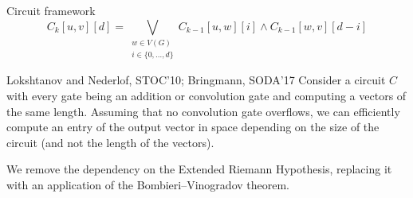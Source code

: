 \begin{frame}{Circuit framework}
    $$C_k[u,v][d]=\bigvee_{\substack{w\in V(G) \\  i\in \{0,\ldots,d\}}} C_{k-1}[u,w][i] \wedge C_{k-1}[w,v][d-i]$$
    
     
     
    \begin{block}{Lokshtanov and Nederlof, STOC'10; Bringmann, SODA'17}
    Consider a circuit $C$ with every gate being an addition or convolution gate and computing a vectors of the same length.
    Assuming that no convolution gate overflows,
    we can efficiently compute an entry of the output vector in space depending on the size of the circuit
    (and not the length of the vectors).
    \end{block}
    
    
    \begin{alertblock}{}
    We remove the dependency on the Extended Riemann Hypothesis, replacing it with an application of the Bombieri--Vinogradov theorem.\\ 
    \end{alertblock}
    
\end{frame}
    